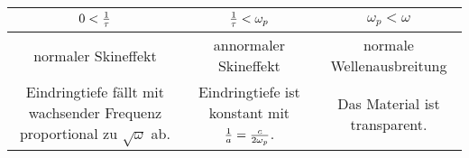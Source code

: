 \begin{tabular}{c|c|c}
	$0<\frac{1}{\tau}$&$\frac{1}{\tau}<\omega_p$&$\omega_p<\omega$\\
	\midrule
	normaler Skineffekt&annormaler Skineffekt&normale Wellenausbreitung\\
	\parbox{.3\linewidth}{Eindringtiefe fällt mit wachsender Frequenz proportional zu $\sqrt{\omega}$ ab.}& \parbox{.3\linewidth}{Eindringtiefe ist konstant mit $\frac{1}{a}=\frac{c}{2\omega_p}$.}& \parbox{.3\linewidth}{Das Material ist transparent.}
\end{tabular}

